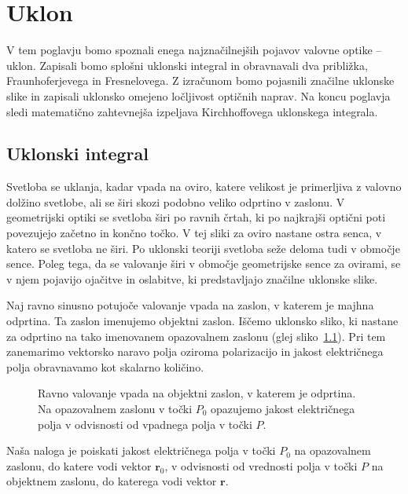 
\chapter{Uklon}
\label{chap:Uklon}
V tem poglavju bomo spoznali enega najznačilnejših pojavov valovne 
optike -- uklon. Zapisali bomo splošni uklonski integral in obravnavali
dva približka, Fraunhoferjevega in Fresnelovega. Z izračunom 
bomo pojasnili značilne uklonske slike in zapisali uklonsko
omejeno ločljivost optičnih naprav. Na koncu poglavja sledi matematično
zahtevnejša izpeljava Kirchhoffovega uklonskega integrala. 

\section{Uklonski integral}
\label{chap:uklint}
Svetloba se uklanja, kadar vpada na oviro, katere velikost je primerljiva z valovno  
dolžino svetlobe, ali se širi skozi podobno veliko odprtino v zaslonu. 
V geometrijski optiki se svetloba širi po ravnih črtah, ki po 
najkrajši optični poti povezujejo začetno in končno točko. V tej sliki za oviro 
nastane ostra senca, v katero se svetloba ne širi. Po uklonski teoriji
svetloba seže deloma tudi v območje sence. Poleg tega, da se valovanje širi
v območje geometrijske sence za ovirami, se v njem pojavijo ojačitve
in oslabitve, ki predstavljajo značilne uklonske slike.

Naj ravno sinusno potujoče valovanje vpada na zaslon, v katerem je majhna odprtina.
Ta zaslon imenujemo objektni zaslon. Iščemo uklonsko sliko, ki nastane
za odprtino na tako imenovanem opazovalnem zaslonu 
(glej sliko~\ref{fig:05_shema}).
Pri tem  zanemarimo vektorsko naravo polja oziroma
polarizacijo in jakost električnega polja obravnavamo kot skalarno količino.

\begin{figure}[ht]
\centering
\def\svgwidth{90truemm} 

\caption{Ravno valovanje vpada na objektni zaslon, v katerem je odprtina. 
Na opazovalnem zaslonu v točki $P_0$ opazujemo jakost električnega polja v
odvisnosti od vpadnega polja v točki $P$.}
\label{fig:05_shema}
\end{figure}

Naša naloga je poiskati jakost električnega polja v točki $P_0$ na opazovalnem zaslonu, 
do katere vodi vektor $\mathbf{r}_0$, v odvisnosti od vrednosti polja v točki $P$
na objektnem zaslonu, do katerega vodi vektor $\mathbf{r}$.

